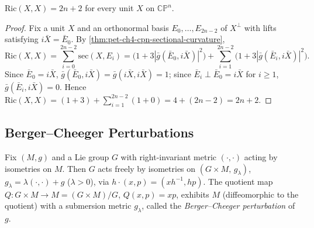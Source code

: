 \begin{proposition}
  \label{prop:pet-ch4-cpn-einstein}
  $\mathrm{Ric}(X,X)=2n+2$ for every unit $X$ on $\mathbb{CP}^n$.
\end{proposition}
\begin{proof}
  Fix a unit $X$ and an orthonormal basis $E_0,\dots,E_{2n-2}$ of $X^\perp$
  with lifts satisfying $i\bar X=\bar E_0$. By
  \cref{thm:pet-ch4-cpn-sectional-curvature},
  \[
    \mathrm{Ric}(X,X)=\sum_{i=0}^{2n-2}\mathrm{sec}(X,E_i)
    =\big(1+3|\bar g(\bar E_0,i\bar X)|^2\big)+\sum_{i=1}^{2n-2}\big(1+3|\bar g(\bar E_i,i\bar X)|^2\big).
  \]
  Since $\bar E_0=i\bar X$, $\bar g(\bar E_0,i\bar X)=\bar g(i\bar X,i\bar X)=1$;
  since $\bar E_i\perp\bar E_0=i\bar X$ for $i\ge1$,
  $\bar g(\bar E_i,i\bar X)=0$. Hence
  $\mathrm{Ric}(X,X)=(1+3)+\sum_{i=1}^{2n-2}(1+0)=4+(2n-2)=2n+2$.
\end{proof}

\subsection{Berger--Cheeger Perturbations}

\begin{definition}
  \label{def:pet-ch4-berger-cheeger-construction}
  Fix $(M,g)$ and a Lie group $G$ with right-invariant metric $(\cdot,\cdot)$
  acting by isometries on $M$. Then $G$ acts freely by isometries on
  $(G\times M,\,g_\lambda)$, $g_\lambda=\lambda(\cdot,\cdot)+g$ ($\lambda>0$), via
  $h\cdot(x,p)=(xh^{-1},hp)$. The quotient map $Q:G\times M\to M=(G\times M)/G$,
  $Q(x,p)=xp$, exhibits $M$ (diffeomorphic to the quotient) with a submersion
  metric $g_\lambda$, called the \emph{Berger--Cheeger perturbation} of $g$.
\end{definition}

